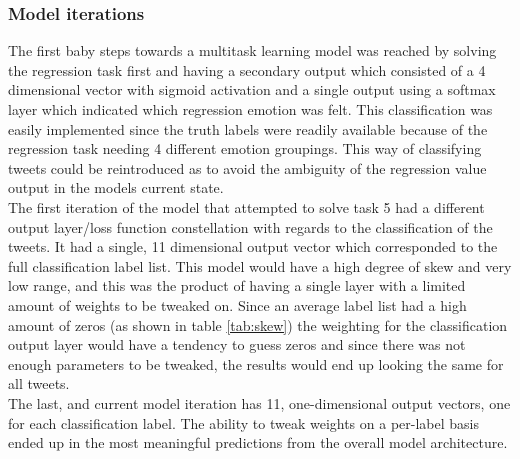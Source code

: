 \subsubsection{Model iterations} \label{sec:iter}
The first baby steps towards a multitask learning model was reached by solving the regression task first and having a secondary output which consisted of a 4 dimensional vector with sigmoid activation and a single output using a softmax layer which indicated which regression emotion was felt. This classification was easily implemented since the truth labels were readily available because of the regression task needing 4 different emotion groupings. This way of classifying tweets could be reintroduced as to avoid the ambiguity of the regression value output in the models current state.\\
The first iteration of the model that attempted to solve task 5 had a different output layer/loss function constellation with regards to the classification of the tweets. It had a single, 11 dimensional output vector which corresponded to the full classification label list. This model would have a high degree of skew and very low range, and this was the product of having a single layer with a limited amount of weights to be tweaked on. Since an average label list had a high amount of zeros (as shown in table \ref{tab:skew}) the weighting for the classification output layer would have a tendency to guess zeros and since there was not enough parameters to be tweaked, the results would end up looking the same for all tweets.\\
The last, and current model iteration has 11, one-dimensional output vectors, one for each classification label. The ability to tweak weights on a per-label basis ended up in the most meaningful predictions from the overall model architecture.

